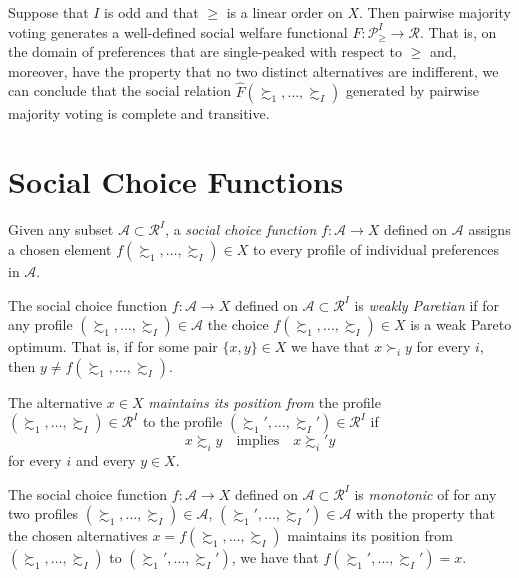 \begin{prop}
    Suppose that $I$ is odd and that $\geq$ is a linear order on $X$. Then pairwise majority voting generates a well-defined social welfare functional $F : \mathscr{P}_\geq^I \to \mathscr{R}$. That is, on the domain of preferences that are single-peaked with respect to $\geq$ and, moreover, have the property that no two distinct alternatives are indifferent, we can conclude that the social relation $\hat{F} (\succsim_1, \dots, \succsim_I)$ generated by pairwise majority voting is complete and transitive.
\end{prop}


\section{Social Choice Functions}

\begin{defn}
    Given any subset $\mathscr{A} \subset \mathscr{R}^I$, a \emph{social choice function} $f : \mathscr{A} \to X$ defined on $\mathscr{A}$ assigns a chosen element $f (\succsim_1, \dots, \succsim_I) \in X$ to every profile of individual preferences in $\mathscr{A}$.
\end{defn}

\begin{defn}
    The social choice function $f : \mathscr{A} \to X$ defined on $\mathscr{A} \subset \mathscr{R}^I$ is \emph{weakly Paretian} if for any profile $(\succsim_1, \dots, \succsim_I) \in \mathscr{A}$ the choice $f (\succsim_1, \dots, \succsim_I) \in X$ is a weak Pareto optimum. That is, if for some pair $\{x, y\} \in X$ we have that $x \succ_i y$ for every $i$, then $y \neq f (\succsim_1, \dots, \succsim_I)$.
\end{defn}

\begin{defn}
    The alternative $x \in X$ \emph{maintains its position from} the profile $(\succsim_1, \dots, \succsim_I) \in \mathscr{R}^I$ to the profile $(\succsim_1', \dots, \succsim_I') \in \mathscr{R}^I$ if 
    \begin{equation*}
        x \succsim_i y \quad \text{implies} \quad x \succsim_i' y
    \end{equation*}
    for every $i$ and every $y \in X$.
\end{defn}

\begin{defn}
    The social choice function $f : \mathscr{A} \to X$ defined on $\mathscr{A} \subset \mathscr{R}^I$ is \emph{monotonic} of for any two profiles $(\succsim_1, \dots, \succsim_I) \in \mathscr{A}$, $(\succsim_1', \dots, \succsim_I') \in \mathscr{A}$ with the property that the chosen alternatives $x = f (\succsim_1, \dots, \succsim_I)$ maintains its position from $(\succsim_1, \dots, \succsim_I)$ to $(\succsim_1', \dots, \succsim_I')$, we have that $f (\succsim_1', \dots, \succsim_I') = x$.
\end{defn}


